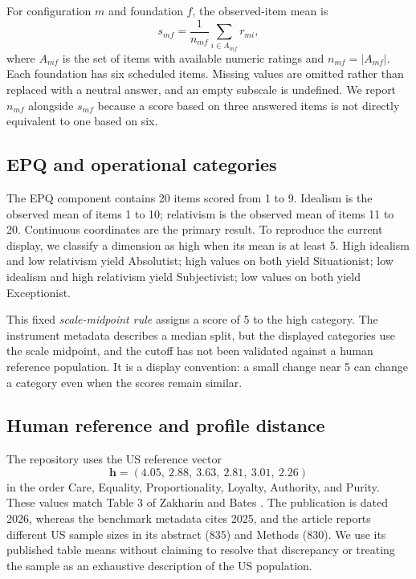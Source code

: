 \documentclass[11pt]{article}
\begin{document}
For configuration $m$ and foundation $f$, the observed-item mean is
\begin{equation}
 s_{mf}=\frac{1}{n_{mf}}\sum_{i\in A_{mf}}r_{mi},
\end{equation}
where $A_{mf}$ is the set of items with available numeric ratings and $n_{mf}=|A_{mf}|$. Each foundation has six scheduled items. Missing values are omitted rather than replaced with a neutral answer, and an empty subscale is undefined. We report $n_{mf}$ alongside $s_{mf}$ because a score based on three answered items is not directly equivalent to one based on six.

\subsection{EPQ and operational categories}
The EPQ component contains 20 items scored from 1 to 9. Idealism is the observed mean of items 1 to 10; relativism is the observed mean of items 11 to 20. Continuous coordinates are the primary result. To reproduce the current display, we classify a dimension as high when its mean is at least 5. High idealism and low relativism yield Absolutist; high values on both yield Situationist; low idealism and high relativism yield Subjectivist; low values on both yield Exceptionist.

This fixed \emph{scale-midpoint rule} assigns a score of 5 to the high category. The instrument metadata describes a median split, but the displayed categories use the scale midpoint, and the cutoff has not been validated against a human reference population. It is a display convention: a small change near 5 can change a category even when the scores remain similar.

\subsection{Human reference and profile distance}
The repository uses the US reference vector
\begin{equation}
\mathbf{h}=(4.05,\ 2.88,\ 3.63,\ 2.81,\ 3.01,\ 2.26)
\end{equation}
in the order Care, Equality, Proportionality, Loyalty, Authority, and Purity. These values match Table 3 of Zakharin and Bates \cite{zakharin}. The publication is dated 2026, whereas the benchmark metadata cites 2025, and the article reports different US sample sizes in its abstract (835) and Methods (830). We use its published table means without claiming to resolve that discrepancy or treating the sample as an exhaustive description of the US population.
\end{document}
